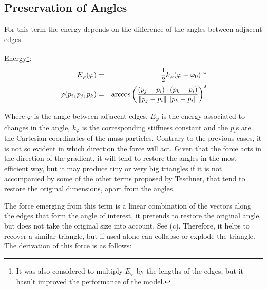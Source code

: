 
\subsection{Preservation of Angles}

For this term the energy depends on the difference of the angles between adjacent edges.

Energy\footnote{It was also considered to multiply $E_\varphi$ by the lengths of the edges, but it hasn't improved the performance of the model.}:
\begin{eqnarray}
 E_\varphi(\varphi) & = & \frac{1}{2}k_\varphi(\varphi - \varphi_0) \textmd{   *} \\
 \varphi(p_i,p_j,p_k) & = & \arccos \left( \dfrac{(p_j - p_i) \cdot (p_k - p_i)}{ \left\| p_j - p_i \right\| \left\|p_k - p_i \right\|} \right)^2 \nonumber
\end{eqnarray}

Where $\varphi$ is the angle between adjacent edges, $E_\varphi$ is the energy associated to changes in the angle, $k_\varphi$ is the corresponding stiffness constant and the $p_i$s are the Cartesian coordinates of the mass particles.  Contrary to the previous cases, it is not so evident in which direction the force will act.  Given that the force acts in the direction of the gradient, it will tend to restore the angles in the most efficient way, but it may produce tiny or very big triangles if it is not accompanied by some of the other terms proposed by Teschner, that tend to restore the original dimensions, apart from the angles.


The force emerging from this term is a linear combination of the vectors along the edges that form the angle of interest, it pretends to restore the original angle, but does not take the original size into account. See (c). Therefore, it helps to recover a similar triangle, but if used alone can collapse or explode the triangle.  The derivation of this force is as follows:  %


